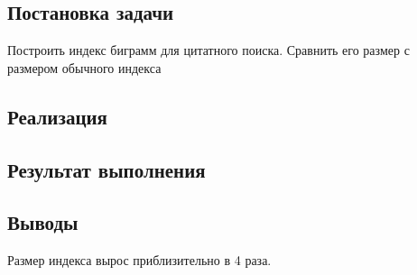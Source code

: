 \documentclass[a4paper, 12pt]{article}
\begin{document}

\newpage


\subsection*{Постановка задачи}
Построить индекс биграмм для цитатного поиска. Сравнить его размер с размером обычного индекса


\subsection*{Реализация}



\subsection*{Результат выполнения}



\subsection*{Выводы}
Размер индекса вырос приблизительно в 4 раза.
\end{document}

